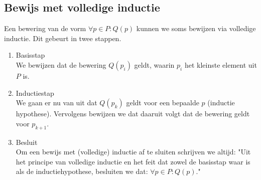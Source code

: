 \documentclass[lineaire_algebra_oplossingen.tex]{subfiles}
\begin{document}
\subsection{Bewijs met volledige inductie}
Een bewering van de vorm $\forall p \in P: Q(p)$ kunnen we soms bewijzen via volledige inductie. Dit gebeurt in twee stappen.
\begin{enumerate}
\item Basisstap\\
We bewijzen dat de bewering $Q(p_i)$ geldt, waarin $p_i$ het kleinste element uit $P$ is.
\item Inductiestap\\
We gaan er nu van uit dat $Q(p_k)$ geldt voor een bepaalde $p$ (inductie hypothese). Vervolgens bewijzen we dat daaruit volgt dat de bewering geldt voor $p_{k+1}$.
\item Besluit \\
Om een bewijs met (volledige) inductie af te sluiten schrijven we altijd: "Uit het principe van volledige inductie en het feit dat zowel de basisstap waar is als de inductiehypothese, besluiten we dat: $\forall p\in P: Q(p)$."
\end{enumerate}
\end{document}
